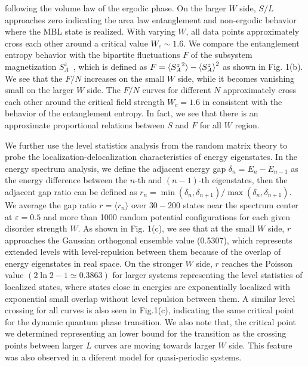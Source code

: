 \documentclass[prl,aps,epsf,showpacs,twocolumn]{revtex4}
\begin{document}
following the volume law of the ergodic phase.    On the  larger $W$ side, $S/L$
approaches zero indicating the area law  entanglement and non-ergodic behavior
where the MBL state is realized.  With varying $W$,  all data points
approximately cross each other around  a critical value  $W_c \sim 1.6$.  We
compare the entanglement entropy behavior with the  bipartite fluctuations $F$
of the subsystem magnetization $S^z_A$~\cite{luitz2015,song2012}, which is
defined as $F=\braket{{S^{z}_A}^2} - \braket{S^z_A}^2$ as shown  in Fig. 1(b).
We see that the $F/N$ increases on the  small  $W$ side, while it becomes
vanishing small on the larger $W$ side.  The $F/N$ curves for different $N$
approximately cross each other around the critical field strength $W_c=1.6$ in
consistent with the behavior of the entanglement entropy.  In fact, we see that
there is an approximate proportional relations between $S$ and $F$  for all $W$
region. 




We further use the  level statistics analysis from the random matrix
theory\cite{atas2013,oganesyan2007} to probe the localization-delocalization
characteristics of  energy  eigenstates.
In the energy spectrum analysis\cite{luitz2015}, we define the adjacent  energy
gap $\delta_n=E_n-E_{n-1}$ as the energy difference between the $n$-th and
$(n-1)$-th eigenstates, then the adjacent gap ratio can be defined as
$r_n=\min(\delta_n, \delta_{n+1})/\max(\delta_n, \delta_{n+1})$.  We  average the
gap ratio $r=\langle r_n\rangle$  over $30-200$  states near the spectrum center at
$\varepsilon=0.5$   and more than 1000 random  potential configurations for each
given disorder  strength $W$.   As shown in Fig. 1(c),   we see that at the
small $W$ side, $r$ approaches  the Gaussian  orthogonal ensemble  value
(0.5307),  which represents extended levels with level-repulsion  between them
because of the overlap of  energy eigenstates in real space.  On the stronger
$W$ side,  $r$ reaches the Poisson value $(2\ln2-1\simeq 0.3863)$ for larger
systems representing the level statistics of   localized states, where  states
close in energies are  exponentially localized with exponential small overlap
without level repulsion between them\cite{mehta1991}.  A similar level crossing
for all curves is also seen in Fig.1(c),  indicating the same critical point for
the dynamic quantum phase transition.  We also note that,   the critical point
we determined representing an lower  bound for the transition as the crossing
points between larger $L$ curves are moving towards larger $W$ side.    This
feature was also observed in a diferent model for quasi-periodic
systems\cite{vedika2016}.
\end{document}
